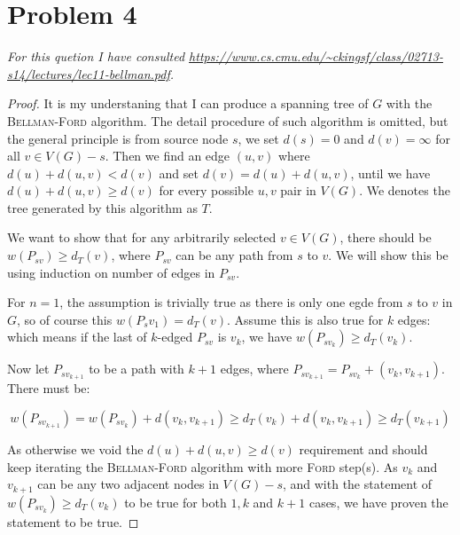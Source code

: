 \documentclass[11pt]{article}
\begin{document}
\section*{Problem 4}

\textit{For this quetion I have consulted \url{https://www.cs.cmu.edu/~ckingsf/class/02713-s14/lectures/lec11-bellman.pdf}.}


\begin{proof}

It is my understaning that I can produce a spanning tree of $G$ with the \textsc{Bellman-Ford} algorithm. The detail procedure of such algorithm is omitted, but the general principle is from source node $s$, we set $d(s) = 0$ and $d(v) = \infty$ for all $v \in V(G) - s$. Then we find an edge $(u, v)$ where $d(u) + d(u, v) < d(v)$ and set $d(v) = d(u) + d(u,v)$, until we have $d(u) + d(u, v) \geq d(v)$ for every possible $u, v$ pair in $V(G)$. We denotes the tree generated by this algorithm as $T$.\newline

We want to show that for any arbitrarily selected $v \in V(G)$, there should be $w(P_{sv}) \geq d_T(v)$, where $P_{sv}$ can be any path from $s$ to $v$.  We will show this be using induction on number of edges in $P_{sv}$.

For $n = 1$, the assumption is trivially true as there is only one egde from $s$ to $v$ in $G$, so of course this $w(P_sv_1) = d_T(v)$. Assume this is also true for $k$ edges: which means if the last of $k$-edged $P_{sv}$ is $v_k$, we have $w(P_{sv_k}) \geq d_T(v_k)$.

Now let $P_{sv_{k+1}}$ to be a path with $k+1$ edges, where $P_{sv_{k+1}} = P_{sv_k} + (v_k, v_{k+1})$. There must be:

\begin{equation*}
    w(P_{sv_{k+1}}) = w(P_{sv_k}) + d(v_k, v_{k+1}) \geq d_T(v_k) + d(v_k, v_{k+1}) \geq d_T(v_{k+1})
\end{equation*}

As otherwise we void the $d(u) + d(u, v) \geq d(v)$ requirement and should keep iterating the \textsc{Bellman-Ford} algorithm with more \textsc{Ford} step(s). As $v_k$ and $v_{k+1}$ can be any two adjacent nodes in $V(G) - s$, and with the statement of $w(P_{sv_k}) \geq d_T(v_k)$ to be true for both $1, k$ and $k+1$ cases, we have proven the statement to be true.

\end{proof}

%
% 
% 
\end{document}
